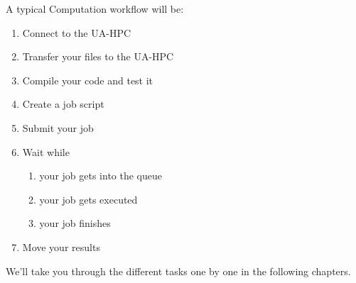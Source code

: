 A typical Computation workflow will be:

\begin{enumerate}
\item  Connect to the UA-HPC
\item  Transfer your files to the UA-HPC
\item  Compile your code and test it
\item  Create a job script
\item  Submit your job
\item  Wait while

\begin{enumerate}
\item  your job gets into the queue
\item  your job gets executed
\item  your job finishes
\end{enumerate}
\item  Move your results
\end{enumerate}

We'll take you through the different tasks one by one in the following chapters.

